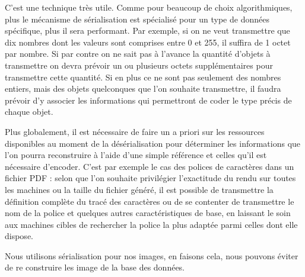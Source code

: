 C'est une technique très utile. Comme pour beaucoup de choix algorithmiques, plus le mécanisme de sérialisation est spécialisé pour un type de données spécifique, plus il sera performant. Par exemple, si on ne veut transmettre que dix nombres dont les valeurs sont comprises entre 0 et 255, il suffira de 1 octet par nombre. Si par contre on ne sait pas à l'avance la quantité d'objets à transmettre on devra prévoir un ou plusieurs octets supplémentaires pour transmettre cette quantité. Si en plus ce ne sont pas seulement des nombres entiers, mais des objets quelconques que l'on souhaite transmettre, il faudra prévoir d'y associer les informations qui permettront de coder le type précis de chaque objet.

Plus globalement, il est nécessaire de faire un a priori sur les ressources disponibles au moment de la désérialisation pour déterminer les informations que l'on pourra reconstruire à l'aide d'une simple référence et celles qu'il est nécessaire d'encoder. C'est par exemple le cas des polices de caractères dans un fichier PDF : selon que l'on souhaite privilégier l'exactitude du rendu sur toutes les machines ou la taille du fichier généré, il est possible de transmettre la définition complète du tracé des caractères ou de se contenter de transmettre le nom de la police et quelques autres caractéristiques de base, en laissant le soin aux machines cibles de rechercher la police la plus adaptée parmi celles dont elle dispose.

Nous utilisons sérialisation pour nos images, en faisons cela, nous pouvons éviter de re construire les image de la base des données.




